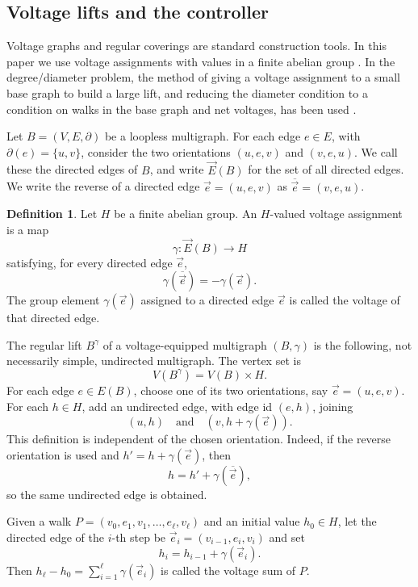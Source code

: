 \documentclass[11pt]{article}
\theoremstyle{definition}
\newtheorem{definition}[theorem]{Definition}
\theoremstyle{remark}
\renewcommand{\_}{\textunderscore\allowbreak}
\begin{document}
\subsection{Voltage lifts and the
controller}\label{a.2-voltage-lifts-and-the-controller}

Voltage graphs and regular coverings are standard construction tools. In
this paper we use voltage assignments with values in a finite abelian
group \cite{GrossTucker2001}. In the degree/diameter problem, the
method of giving a voltage assignment to a small base graph to build a
large lift, and reducing the diameter condition to a condition on walks
in the base graph and net voltages, has been used \cite{BrankovicEtAl1998a,
LozSiran2008}.

Let \(B=(V,E,\partial)\) be a loopless multigraph. For each edge
\(e\in E\), with \(\partial(e)=\{u,v\}\), consider the two orientations
\((u,e,v)\) and \((v,e,u)\). We call these the directed edges of \(B\),
and write \(\overrightarrow E(B)\) for the set of all directed edges. We
write the reverse of a directed edge \(\vec e=(u,e,v)\) as
\(\overline{\vec e}=(v,e,u)\).

\begin{definition}\label{def:voltage}
Let \(H\) be a finite abelian group. An
\(H\)-valued voltage assignment is a map \[
  \gamma:\overrightarrow E(B)\to H
\] satisfying, for every directed edge \(\vec e\), \[
  \gamma(\overline{\vec e})=-\gamma(\vec e) .
\] The group element \(\gamma(\vec e)\) assigned to a directed edge
\(\vec e\) is called the voltage of that directed edge.
\end{definition}

The regular lift \(B^\gamma\) of a voltage-equipped multigraph
\((B,\gamma)\) is the following, not necessarily simple, undirected
multigraph. The vertex set is \[
  V(B^\gamma)=V(B)\times H .
\] For each edge \(e\in E(B)\), choose one of its two orientations, say
\(\vec e=(u,e,v)\). For each \(h\in H\), add an undirected edge, with
edge id \((e,h)\), joining \[
  (u,h)
  \quad\text{and}\quad
  (v,h+\gamma(\vec e)).
\] This definition is independent of the chosen orientation. Indeed, if
the reverse orientation is used and \(h'=h+\gamma(\vec e)\), then \[
  h=h'+\gamma(\overline{\vec e}),
\] so the same undirected edge is obtained.

Given a walk \(P=(v_0,e_1,v_1,\ldots,e_\ell,v_\ell)\) and an initial
value \(h_0\in H\), let the directed edge of the \(i\)-th step be
\(\vec e_i=(v_{i-1},e_i,v_i)\) and set \[
  h_i=h_{i-1}+\gamma(\vec e_i) .
\] Then \(h_\ell-h_0=\sum_{i=1}^\ell \gamma(\vec e_i)\) is called the
voltage sum of \(P\).
\end{document}
